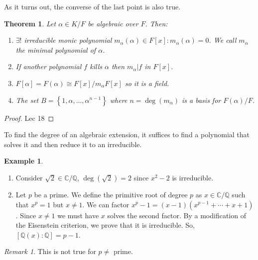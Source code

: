 \documentclass{article}
\newcommand\Q{\ensuremath{\mathbb{Q}}}
\newcommand\C{\ensuremath{\mathbb{C}}}
\newtheorem{theorem}{Theorem}[section]
\theoremstyle{definition}
\newtheorem{eg}{Example}[subsection]
\theoremstyle{remark}
\newtheorem*{remark}{Remark}
\theoremstyle{plain}
\begin{document}
As it turns out, the converse of the last point is also true. 

\begin{theorem}
    Let \(\alpha \in K/F\) be algebraic over \(F\). Then:
    \begin{enumerate}
        \item \(\exists!\) irreducible monic polynomial \(m_{\alpha}(\alpha) \in F[x]: m_{\alpha}(\alpha) = 0\). We call \(m_{\alpha}\) the minimal polynomial of \(\alpha\).
        \item If another polynomial \(f\) kills \(\alpha\) then \(m_{\alpha}|f\) in \(F[x]\).
        \item \(F[\alpha] = F(\alpha) \cong F[x]/m_{\alpha}F[x]\) so it is a field.
        \item The set \(B = \left\{ 1, \alpha, \ldots, \alpha^{n-1} \right\}\) where \(n = \deg (m_{\alpha})\) is a basis for \(F(\alpha)/F\).
    \end{enumerate}
\end{theorem}
\begin{proof}
    Lec 18
\end{proof}

To find the degree of an algebraic extension, it suffices to find a polynomial that solves it and then reduce it to an irreducible.  

\begin{eg}
    \begin{enumerate}
        \item Consider \(\sqrt{2} \in \C/\Q\), \(\deg(\sqrt{2}) = 2\) since \(x^2 - 2\) is irreducible. 
        \item Let \(p\) be a prime. We define the primitive root of degree \(p\) as \(x \in \C/\Q\) such that
        \(x^p = 1\) but \(x \neq 1\). We can factor \(x^p - 1 = (x-1)(x^{p-1} + \cdots + x + 1)\). Since \(x \neq 1\) we must have 
        \(x\) solves the second factor. By a modification of the Eisenstein criterion, we prove that it is irreducible. So, \([\Q(x):\Q] = p-1\).
    \end{enumerate}
\end{eg}

\begin{remark}
    This is not true for \(p \neq\) prime. 
\end{remark}
\end{document}
